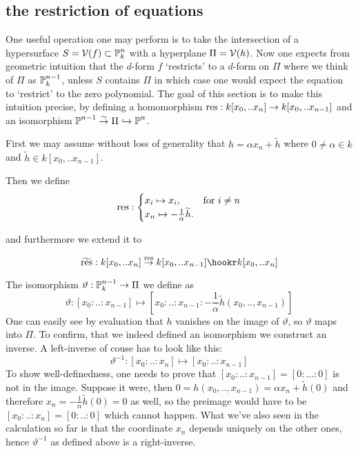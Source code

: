 \subsection{the restriction of equations}


One useful operation one may perform is to take the intersection of a hypersurface $S = \operatorname{\mathcal V}(f) \subset \operatorname{\mathbb P}^n_k$ with a hyperplane $\Pi = \operatorname{\mathcal V}(h)$. Now one expects from geometric intuition that the $d$-form $f$ `restricts' to a $d$-form on $\Pi$ where we think of $\Pi$ as $\operatorname{\mathbb P}^{n-1}_k$, unless $S$ contains $\Pi$ in which case one would expect the equation to `restrict' to the zero polynomial.
The goal of this section is to make this intuition precise, by defining a homomorphism ${\operatorname{res}} : k[x_0,..x_n] \to k[x_0,..x_{n-1}]$ and an isomorphism $\operatorname{\mathbb P}^{n-1} \overset\sim\to \Pi \hookrightarrow \operatorname{\mathbb P}^n$.

First we may assume without loss of generality that
$h = \alpha x_n + \widetilde h$ where $0 \neq \alpha \in k$ and $\widetilde h \in k[x_0,..x_{n-1}]$.

Then we define
\begin{equation}
{\operatorname{res}} : \begin{cases}
x_i \mapsto x_i, & \text{for } i \neq n \\
x_n \mapsto -\frac 1\alpha \widetilde h. &
\end{cases}
\end{equation}

and furthermore we extend it to

\begin{equation}
\widetilde{\var{res}} : k[x_0,.. x_n] \overset{\var{res}}\to k[x_0,.. x_{n-1}] \hookr k[x_0,.. x_n]
\end{equation}

The isomorphism $\vartheta : \operatorname{\mathbb P}^{n-1}_k \to \Pi$ we define as
\begin{equation}
\vartheta : [x_0:..:x_{n-1}] \mapsto [x_0:..:x_{n-1}:-\frac 1\alpha \widetilde h(x_0,..,x_{n-1})]
\end{equation}
One can easily see by evaluation that $h$ vanishes on the image of $\vartheta$, so $\vartheta$ maps into $\Pi$. To confirm, that we indeed defined an isomorphism we construct an inverse.
A left-inverse of couse has to look like this:
\begin{equation}
\vartheta^{-1} : [x_0:..:x_n] \mapsto [x_0:..:x_{n-1}]
\end{equation}
To show well-definedness, one needs to prove that $[x_0:..:x_{n-1}] = [0:...:0]$ is not in the image. Suppose it were, then $0 = h(x_0,..,x_{n-1}) = \alpha x_n + \widetilde h(0)$ and therefore $x_n = -\frac 1\alpha \widetilde h(0) = 0$ as well, so the preimage would have to be $[x_0:..:x_n] = [0:..:0]$ which cannot happen.
What we've also seen in the calculation so far is that the coordinate $x_n$ depends uniquely on the other ones, hence $\vartheta^{-1}$ as defined above is a right-inverse.


